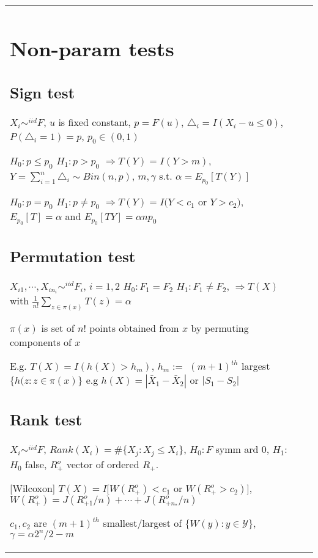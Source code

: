 \begin{tabulary}{\textwidth}{l || L}

	\section{Non-param tests}

	\subsection{Sign test}

	$X_i\sim^{iid} F$, $u$ is fixed constant, $p=F(u)$,
	$\triangle_i = I(X_i - u \leq 0)$,
	$P(\triangle_i = 1 ) = p$, $p_0\in(0, 1)$

	$H_0: p \leq p_0$ $H_1: p > p_0$
	$\Rightarrow T(Y) = I(Y > m)$,
	$Y = \sum_{i=1}^n \triangle_i \sim Bin(n, p)$,
	$m, \gamma$ s.t. $\alpha = E_{p_0}[T(Y)]$

	$H_0: p = p_0$ $H_1: p \neq p_0$
	$\Rightarrow T(Y) = I(Y < c_1 $ or $Y > c_2)$,
	$E_{p_0}[T] = \alpha$ and $E_{p_0}[TY] = \alpha n p_0$

	\subsection{Permutation test}
	$X_{i1}, \cdots, X_{i n_i} \sim^{iid} F_i$, $i=1, 2$
	$H_0: F_1 = F_2$ $H_1: F_1 \neq F_2$,
	$\Rightarrow T(X)$ with $\frac{1}{n!}\sum_{z\in\pi(x)}T(z) = \alpha$

	$\pi(x)$ is set of $n!$ points obtained from $x$ by permuting components of
	$x$

	E.g. $T(X) = I(h(X) > h_m)$,
	$h_m := $ $(m+1)^{th}$ largest $\{h(z : z \in \pi(x)\}$
	e.g $h(X) = |\bar X_1 - \bar X_2|$ or $|S_1 - S_2|$

	\subsection{Rank test}

	$X_i \sim^{iid} F$, $Rank(X_i) = \#\{X_j: X_j \leq X_i\}$,
	$H_0: F$ symm ard 0, $H_1:$ $H_0$ false,
	$R_+^o$ vector of ordered $R_+$.

		[Wilcoxon] $T(X) = I[W(R_+^o) < c_1$ or $W(R_+^o > c_2)]$,
	$W(R_+^o) = J(R_{+1}^o/n) + \cdots + J(R_{+n_*}^o/n)$

	$c_1, c_2$ are $(m+1)^{th}$ smallest/largest of $\{W(y): y\in \mathcal{Y}\}$,
	$\gamma = \alpha 2^n / 2 - m$



\end{tabulary}

